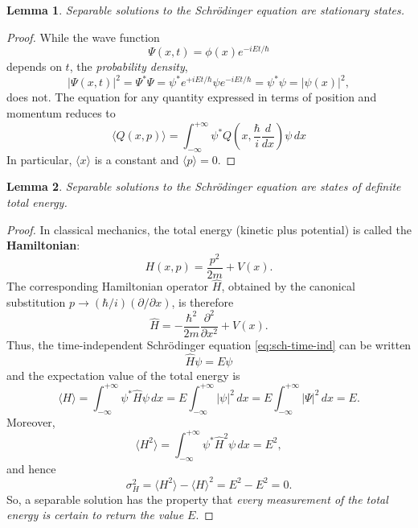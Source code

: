 \documentclass{article}
\newtheorem*{lemma*}{Lemma}
\begin{document}
\begin{lemma*}
  Separable solutions to the Schr\"{o}dinger equation are \emph{stationary
  states}.
\end{lemma*}
\begin{proof}
  While the wave function \[
    \Psi(x, t) = \phi(x)e^{-iEt/\hbar}
  \] depends on $t$, the \emph{probability density}, \[
    |\Psi(x, t)|^2
    = \Psi^* \Psi
    = \psi^* e^{+iEt/\hbar} \psi e^{-iEt/\hbar}
    = \psi^* \psi
    = |\psi(x)|^2,
  \] does not. The equation for any quantity expressed in terms of position and
  momentum reduces to
  \begin{equation} \label{eq:sch-time-ind-qty}
    \langle Q(x, p) \rangle = \int^{+\infty}_{-\infty}
      \psi^* Q\left(x, \frac{\hbar}{i}\frac{d}{dx}\right) \psi
    \,dx
  \end{equation}
  In particular, $\langle x \rangle$ is a constant and $\langle p \rangle = 0$.
\end{proof}

\begin{lemma*}
  Separable solutions to the Schr\"{o}dinger equation are states of
  \emph{definite total energy}.
\end{lemma*}
\begin{proof}
  In classical mechanics, the total energy (kinetic plus potential) is called
  the \textbf{Hamiltonian}: \[
    H(x, p) = \frac{p^2}{2m} + V(x).
  \] The corresponding Hamiltonian operator $\hat{H}$, obtained by the
  canonical substitution $p \rightarrow (\hbar/i)(\partial/\partial x)$, is
  therefore
  \begin{equation} \label{eq:ham-op}
    \hat{H} = -\frac{\hbar^2}{2m} \frac{\partial^2}{\partial x^2} + V(x).
  \end{equation}
  Thus, the time-independent Schr\"{o}dinger equation \eqref{eq:sch-time-ind}
  can be written
  \begin{equation} \label{eq:sch-time-ind-ham-1}
    \hat{H}\psi = E\psi
  \end{equation}
  and the expectation value of the total energy is
  \begin{equation} \label{eq:sch-time-ind-ham}
    \langle H \rangle
    = \int_{-\infty}^{+\infty} \psi^* \hat{H} \psi \,dx
    = E\int_{-\infty}^{+\infty} |\psi|^2 \,dx
    = E\int_{-\infty}^{+\infty} |\Psi|^2 \,dx
    = E.
  \end{equation}
  Moreover, \[
    \langle H^2 \rangle
    = \int_{-\infty}^{+\infty} \psi^* \hat{H}^2 \psi \,dx
    = E^2,
  \] and hence
  \begin{equation} \label{eq:sch-time-ind-ham-var}
    \sigma_H^2 = \langle H^2 \rangle - \langle H \rangle^2 = E^2 - E^2 = 0.
  \end{equation}
  So, a separable solution has the property that \emph{every measurement of the
  total energy is certain to return the value $E$}.
\end{proof}
\end{document}
